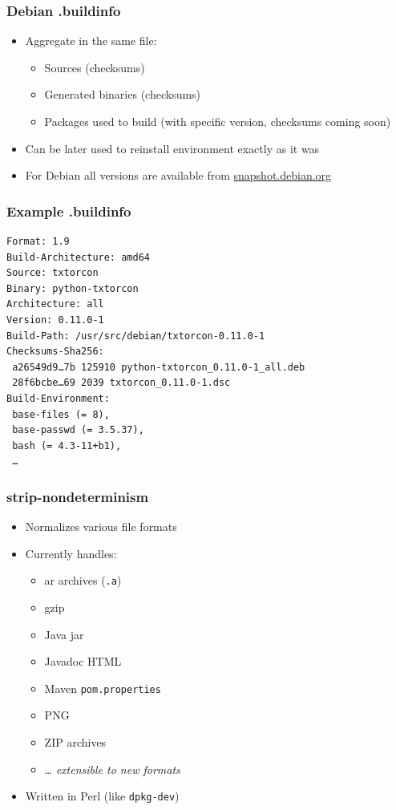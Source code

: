 \documentclass[14pt]{beamer}
\begin{document}
\begin{frame}
 \frametitle{Debian .buildinfo}

 \begin{itemize}
  \item Aggregate in the same file:
   \begin{itemize}
    \item Sources (checksums)
    \item Generated binaries (checksums)
    \item Packages used to build (with specific version, checksums coming soon)
   \end{itemize}
  \item Can be later used to reinstall environment exactly as it was
  \item For Debian all versions are available from \url{snapshot.debian.org}
 \end{itemize}
\end{frame}


\begin{frame}[fragile]
 \frametitle{Example .buildinfo}

{\small
\begin{verbatim}
Format: 1.9
Build-Architecture: amd64
Source: txtorcon
Binary: python-txtorcon
Architecture: all
Version: 0.11.0-1
Build-Path: /usr/src/debian/txtorcon-0.11.0-1
Checksums-Sha256:
 a26549d9…7b 125910 python-txtorcon_0.11.0-1_all.deb
 28f6bcbe…69 2039 txtorcon_0.11.0-1.dsc
Build-Environment:
 base-files (= 8),
 base-passwd (= 3.5.37),
 bash (= 4.3-11+b1),
 …
\end{verbatim}
}
\end{frame}


\begin{frame}
 \frametitle{strip-nondeterminism}

 \begin{itemize}
  \item Normalizes various file formats
  \item Currently handles:
   \begin{itemize}
    \item ar archives (\texttt{.a})
    \item gzip
    \item Java jar
    \item Javadoc HTML
    \item Maven \texttt{pom.properties}
    \item PNG
    \item ZIP archives
    \item … \textit{extensible to new formats}
   \end{itemize}
  \item Written in Perl (like \texttt{dpkg-dev})
 \end{itemize}
\end{frame}
\end{document}
